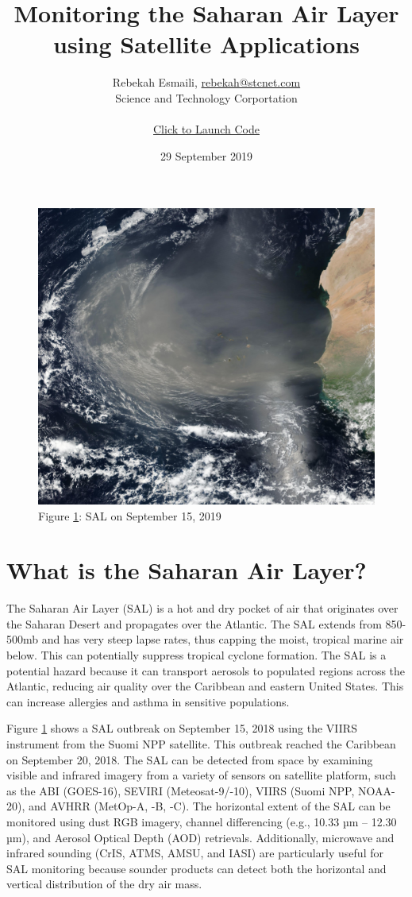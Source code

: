 \documentclass[11pt]{article}
\title{Monitoring the Saharan Air Layer using Satellite Applications}
\author{Rebekah Esmaili, \href{mailto:rebekah@stcnet.com}{rebekah@stcnet.com}
    \\ Science and Technology Corportation \\ \\ \href{https://mybinder.org/v2/gh/resmaili/nucaps-sal/master} {Click to Launch Code} }
\date{29 September 2019}
\makeatletter
\def\maxwidth{\ifdim\Gin@nat@width>\linewidth\linewidth
    \else\Gin@nat@width\fi}
\let\Oldincludegraphics\includegraphics
\renewcommand{\includegraphics}[1]{\Oldincludegraphics[width=.8\maxwidth]{#1}}
\makeatother
\begin{document}
    \maketitle


\begin{figure}
\centering
\includegraphics{images/SAL.jpeg}
\caption{Figure \ref{fig:sal}: SAL on September 15, 2019}
\label{fig:sal}
\end{figure}

\section{What is the Saharan Air
Layer?}\label{what-is-the-saharan-air-layer}

The Saharan Air Layer (SAL) is a hot and dry pocket of air that
originates over the Saharan Desert and propagates over the Atlantic. The
SAL extends from 850-500mb and has very steep lapse rates, thus capping
the moist, tropical marine air below. This can potentially suppress tropical
cyclone formation. The SAL is a potential hazard because it can
transport aerosols to populated regions across the Atlantic, reducing
air quality over the Caribbean and eastern United States. This can increase allergies and asthma in sensitive populations.


Figure \ref{fig:sal} shows a SAL outbreak on September 15, 2018 using the VIIRS
instrument from the Suomi NPP satellite. This outbreak reached the
Caribbean on September 20, 2018. The SAL can be detected from space by examining visible and infrared imagery from a variety of sensors on satellite platform, such as the ABI (GOES-16), SEVIRI (Meteosat-9/-10), VIIRS (Suomi NPP, NOAA-20), and AVHRR (MetOp-A, -B, -C). The horizontal extent of the SAL can be monitored using dust RGB imagery, channel differencing (e.g., 10.33 µm -- 12.30 µm), and Aerosol Optical Depth (AOD) retrievals. Additionally, microwave and infrared sounding (CrIS, ATMS, AMSU, and IASI) are particularly useful for SAL monitoring because sounder products can detect both the horizontal and vertical distribution of the dry air mass.
\end{document}
